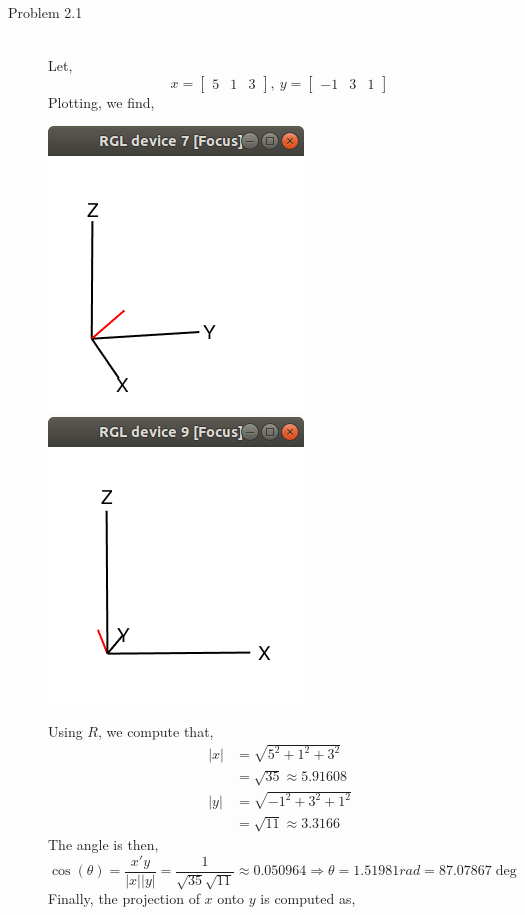 \documentclass[letterpaper,10pt]{article}
\begin{document}
\begin{description}
\item[Problem 2.1]\hfill\\
Let,
\[x=\begin{bmatrix}
5 & 1 & 3
\end{bmatrix},\ y=\begin{bmatrix}
-1 & 3 & 1
\end{bmatrix} \]
Plotting, we find,
\begin{center}
\includegraphics[scale=0.5]{1x.png}
\includegraphics[scale=0.5]{1y.png}
\end{center}
Using $R$, we compute that,
\begin{align*}
|x|&=\sqrt{5^2+1^2+3^2}\\
&=\sqrt{35}\approx 5.91608\\
|y|&=\sqrt{-1^2+3^2+1^2}\\
&=\sqrt{11}\approx 3.3166
\end{align*}
The angle is then,
\[\cos(\theta)=\frac{x'y}{|x||y|}=\frac{1}{\sqrt{35}\sqrt{11}}\approx 0.050964\Rightarrow \theta=1.51981rad=87.07867\deg\]
Finally, the projection of $x$ onto $y$ is computed as,

\end{description}
\end{document}
